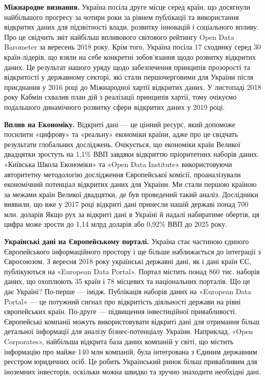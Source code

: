 \textbf{Міжнародне визнання.}
Україна посіла друге місце серед країн, що досягнули найбільшого прогресу за чотири роки за
рівнем публікації та використання відкритих даних для підзвітності влади, розвитку
інновацій і соціального впливу. Про це свідчить звіт найбільш впливового світового рейтингу
Open Data Barometer за вересень 2018 року. Крім того, Україна посіла 17 сходинку серед 30
країн-лідерів, що взяли на себе конкретні зобов'язання щодо розвитку відкритих даних.
Це результат нашого уряду щодо забезпечення принципів прозорості та відкритості у державному
секторі, які стали першочерговими для України після приєднання у 2016 році до Міжнародної
хартії відкритих даних. У листопаді 2018 року Кабмін схвалив план дій з реалізації принципів
хартії, тому очікуємо подальшого динамічного розвитку сфери відкритих даних у 2019 році.

\textbf{Вплив на Економіку.}
Відкриті дані — це цінний ресурс, який допоможе посилити «цифрову» та «реальну» економіки країни, адже про це свідчать результати глобальних досліджень.
Очікується, що економіки країн Великої двадцятки зростуть на 1,1\% ВВП завдяки відкриттю пріоритетних наборів даних.
«Київська Школа Економіки» та «Open Data Institute» використовуючи авторитетну методологію дослідження Європейської комісії,
проаналізували економічний потенціал відкритих даних для України.
Ми стали першою країною за межами країн Великої двадцятки, де був проведений такий аналіз.
Дослідники виявили, що вже у 2017 році відкриті дані принесли нашій державі понад 700 млн. доларів
Якщо рух за відкриті дані в Україні й надалі набиратиме обертів,
ця цифра може зрости до 1,14 млрд доларів або 0,92\% ВВП до 2025 року.

\textbf{Українські дані на Європейському порталі.}
Україна стає частиною єдиного Європейського інформаційного простору і ще більше наближається до інтеграції з Євросоюзом.
З вересня 2018 року українські державні дані, як і дані країн ЄС, публікуються на «European Data Portal».
Портал містить понад 860 тис. наборів даних, що охоплюють 35 країн і 78 місцевих та національних порталів.
Що це дає Україні? По-перше — імідж.
Публікація наборів даних на «European Data Portal» — це потужний сигнал про відкритість
діяльності держави на рівні європейських країн.
По-друге — підвищення інвестиційної привабливості.
Європейські компанії можуть використовувати відкриті дані для отримання більш
детальної інформації для аналізу бізнес-потенціалу України.
Наприклад, «Open Corporates», найбільша відкрита база даних компаній у світі,
що містить інформацію про майже 140 млн компаній, була інтегрована з Єдиним державним реєстром юридичних осіб.
Це робить Український ринок більш привабливим для іноземних інвесторів, оскільки можна
швидко та зручно знаходити необхідні дані.

